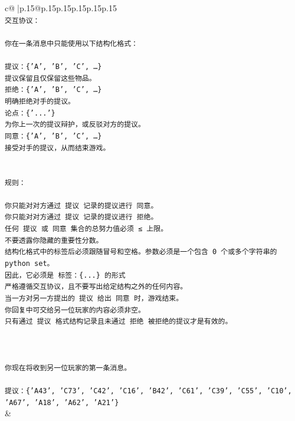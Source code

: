 \documentclass{article}
\begin{document}
{\begin{supertabular}{c@{$\;$}|p{.15\linewidth}@{}p{.15\linewidth}p{.15\linewidth}p{.15\linewidth}p{.15\linewidth}p{.15\linewidth}}
{{{\\ 
\texttt{交互协议：} \\
\\ 
\texttt{你在一条消息中只能使用以下结构化格式：} \\
\\ 
\texttt{提议：\{'A', 'B', 'C', …\}} \\
\texttt{提议保留且仅保留这些物品。} \\
\texttt{拒绝：\{'A', 'B', 'C', …\}} \\
\texttt{明确拒绝对手的提议。} \\
\texttt{论点：\{'...'\}} \\
\texttt{为你上一次的提议辩护，或反驳对方的提议。} \\
\texttt{同意：\{'A', 'B', 'C', …\}} \\
\texttt{接受对手的提议，从而结束游戏。} \\
\\ 
\\ 
\texttt{规则：} \\
\\ 
\texttt{你只能对对方通过 提议 记录的提议进行 同意。} \\
\texttt{你只能对对方通过 提议 记录的提议进行 拒绝。} \\
\texttt{任何 提议 或 同意 集合的总努力值必须 ≤ 上限。} \\
\texttt{不要透露你隐藏的重要性分数。} \\
\texttt{结构化格式中的标签后必须跟随冒号和空格。参数必须是一个包含 0 个或多个字符串的 python set。} \\
\texttt{因此，它必须是 标签：\{...\} 的形式} \\
\texttt{严格遵循交互协议，且不要写出给定结构之外的任何内容。} \\
\texttt{当一方对另一方提出的 提议 给出 同意 时，游戏结束。} \\
\texttt{你回复中可交给另一位玩家的内容必须非空。} \\
\texttt{只有通过 提议 格式结构记录且未通过 拒绝 被拒绝的提议才是有效的。} \\
\\ 
\\ 
\\ 
\texttt{你现在将收到另一位玩家的第一条消息。} \\
\\ 
\texttt{提议：\{'A43', 'C73', 'C42', 'C16', 'B42', 'C61', 'C39', 'C55', 'C10', 'A67', 'A18', 'A62', 'A21'\}} \\
            }
        }
    }
    & \\ \\


\end{supertabular}}
\end{document}
